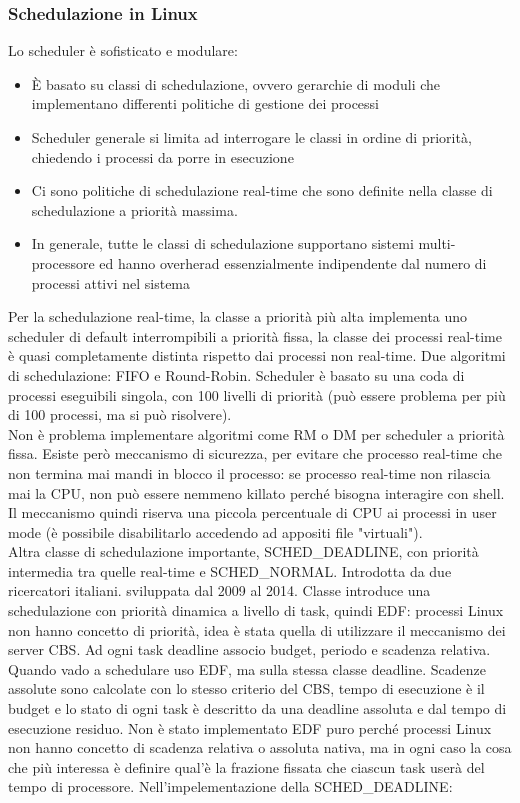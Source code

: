 \documentclass{article}
\begin{document}
\subsubsection{Schedulazione in Linux}
Lo scheduler è sofisticato e modulare: 
\begin{itemize}
\item È basato su classi di schedulazione, ovvero gerarchie di moduli che implementano differenti politiche di gestione dei processi\
\item Scheduler generale si limita ad interrogare le classi in ordine di priorità, chiedendo i processi da porre in esecuzione
\item Ci sono politiche di schedulazione real-time che sono definite nella classe di schedulazione a priorità massima.
\item In generale, tutte le classi di schedulazione supportano sistemi multi-processore ed hanno overherad essenzialmente indipendente dal numero di processi attivi nel sistema
\end{itemize}
Per la schedulazione real-time, la classe a priorità più alta implementa uno scheduler di default interrompibili a priorità fissa, la classe dei processi real-time è quasi completamente distinta rispetto dai processi non real-time. Due algoritmi di schedulazione: FIFO e Round-Robin. Scheduler è basato su una coda di processi eseguibili singola, con 100 livelli di priorità (può essere problema per più di 100 processi, ma si può risolvere).\\ Non è problema implementare algoritmi come RM o DM per scheduler a priorità fissa. Esiste però meccanismo di sicurezza, per evitare che processo real-time che non termina mai mandi in blocco il processo: se processo real-time non rilascia mai la CPU, non può essere nemmeno killato perché bisogna interagire con shell. Il meccanismo quindi riserva una piccola percentuale di CPU ai processi in user mode (è possibile disabilitarlo accedendo ad appositi file "virtuali").\\ Altra classe di schedulazione importante, SCHED\_DEADLINE, con priorità intermedia tra quelle real-time e SCHED\_NORMAL. Introdotta da due ricercatori italiani. sviluppata dal 2009 al 2014. Classe introduce una schedulazione con priorità dinamica a livello di task, quindi EDF: processi Linux non hanno concetto di priorità, idea è stata quella di utilizzare il meccanismo dei server CBS. Ad ogni task deadline associo budget, periodo e scadenza relativa. Quando vado a schedulare uso EDF, ma sulla stessa classe deadline. Scadenze assolute sono calcolate con lo stesso criterio del CBS, tempo di esecuzione è il budget e lo stato di ogni task è descritto da una deadline assoluta e dal tempo di esecuzione residuo. Non è stato implementato EDF puro perché processi Linux non hanno concetto di scadenza relativa o assoluta nativa, ma in ogni caso la cosa che più interessa è definire qual'è la frazione fissata che ciascun task userà del tempo di processore. Nell'impelementazione della SCHED\_DEADLINE:
\end{document}
